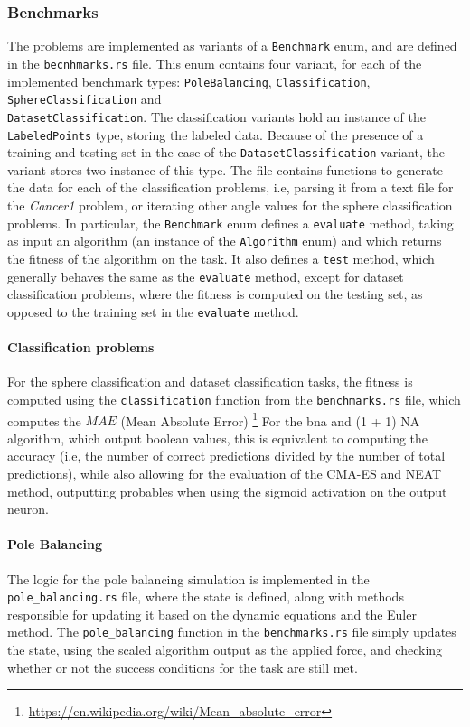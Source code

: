 \subsubsection{Benchmarks}

The problems are implemented as variants of a \texttt{Benchmark} enum, and are defined in the \texttt{becnhmarks.rs} file.
This enum contains four variant, for each of the implemented benchmark types: \texttt{PoleBalancing}, \texttt{Classification}, \texttt{SphereClassification}
and \\ \texttt{DatasetClassification}.
The classification variants hold an instance of the \texttt{LabeledPoints} type, storing the labeled data.
Because of the presence of a training and testing set in the case of the \texttt{DatasetClassification} variant, the variant stores two instance of this type.
The file contains functions to generate the
data for each of the classification problems, i.e, parsing it from a text file for the \textit{Cancer1} problem, or iterating other
angle values for the sphere classification problems. In particular, the \texttt{Benchmark} enum defines a \texttt{evaluate} method, taking as input an
algorithm (an instance of the \texttt{Algorithm} enum) and which returns the fitness of the algorithm on the task.
It also defines a \texttt{test} method, which generally behaves the same as the \texttt{evaluate} method, except for dataset classification problems, where
the fitness is computed on the testing set, as opposed to the training set in the \texttt{evaluate} method.

\paragraph{Classification problems} For the sphere classification and dataset classification tasks, the fitness is computed using the \texttt{classification}
function from the \texttt{benchmarks.rs} file, which computes the $MAE$ (Mean Absolute Error) \footnote{\url{https://en.wikipedia.org/wiki/Mean_absolute_error}}
For the bna and (1 + 1) NA algorithm, which output boolean
values, this is equivalent to computing the accuracy (i.e, the number of correct predictions divided by the number of total predictions), while also
allowing for the evaluation of the CMA-ES and NEAT method, outputting probables when using the sigmoid activation on the output neuron.

\paragraph{Pole Balancing} The logic for the pole balancing simulation is implemented in the  \\ \texttt{pole\_balancing.rs} file, where the state is defined, along with methods
responsible for updating it based on the dynamic equations and the Euler method. The \texttt{pole\_balancing} function in the \texttt{benchmarks.rs} file simply
updates the state, using the scaled algorithm output as the applied force, and checking whether or not the success conditions for the task are still met.

